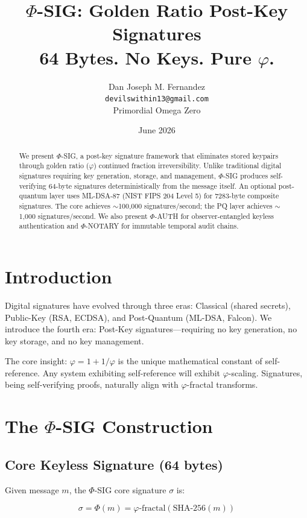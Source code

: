 \documentclass{article}
\title{$\Phi$-SIG: Golden Ratio Post-Key Signatures\\
64 Bytes. No Keys. Pure $\varphi$.}
\author{Dan Joseph M. Fernandez\\
\texttt{devilswithin13@gmail.com}\\
Primordial Omega Zero}
\date{June 2026}
\begin{document}
\maketitle

\begin{abstract}
We present $\Phi$-SIG, a post-key signature framework that eliminates stored keypairs through golden ratio ($\varphi$) continued fraction irreversibility. Unlike traditional digital signatures requiring key generation, storage, and management, $\Phi$-SIG produces self-verifying 64-byte signatures deterministically from the message itself. An optional post-quantum layer uses ML-DSA-87 (NIST FIPS 204 Level 5) for 7283-byte composite signatures. The core achieves $\sim$100,000 signatures/second; the PQ layer achieves $\sim$1,000 signatures/second. We also present $\Phi$-AUTH for observer-entangled keyless authentication and $\Phi$-NOTARY for immutable temporal audit chains.
\end{abstract}

\section{Introduction}

Digital signatures have evolved through three eras: Classical (shared secrets), Public-Key (RSA, ECDSA), and Post-Quantum (ML-DSA, Falcon). We introduce the fourth era: Post-Key signatures—requiring no key generation, no key storage, and no key management.

The core insight: $\varphi = 1 + 1/\varphi$ is the unique mathematical constant of self-reference. Any system exhibiting self-reference will exhibit $\varphi$-scaling. Signatures, being self-verifying proofs, naturally align with $\varphi$-fractal transforms.

\section{The $\Phi$-SIG Construction}

\subsection{Core Keyless Signature (64 bytes)}

Given message $m$, the $\Phi$-SIG core signature $\sigma$ is:

\begin{equation}
\sigma = \Phi(m) = \varphi\text{-fractal}(\text{SHA-256}(m))
\end{equation}
\end{document}
